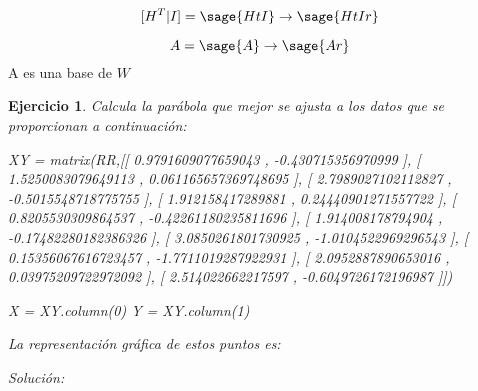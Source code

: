 \documentclass{amsart}
\newtheorem{ejer}{Ejercicio}
\begin{document}
$$
	[H^T|I] = \sage{HtI} \to \sage{HtIr}
$$

$$
	A = \sage{A} \to \sage{Ar}
$$
A es una base de $W$


\begin{ejer} 
Calcula la parábola que mejor se ajusta a los datos que se proporcionan a continuación:
\begin{sageblock}
XY = matrix(RR,[[ 0.9791609077659043 ,  -0.430715356970999 ],
                [ 1.5250083079649113 ,  0.061165657369748695 ],
                [ 2.7989027102112827 ,  -0.5015548718775755 ],
                [ 1.912158417289881 ,  0.24440901271557722 ],
                [ 0.8205530309864537 ,  -0.42261180235811696 ],
                [ 1.914008178794904 ,  -0.17482280182386326 ],
                [ 3.0850261801730925 ,  -1.0104522969296543 ],
                [ 0.15356067616723457 ,  -1.7711019287922931 ],
                [ 2.0952887890653016 ,  0.03975209722972092 ],
                [ 2.514022662217597 ,  -0.6049726172196987 ]])

X = XY.column(0)
Y = XY.column(1)
\end{sageblock}

La representación gráfica de estos puntos es:

\begin{sagesub}
\begin{center}
\end{center}
\end{sagesub}


\end{ejer} 

{\it Solución:}


\end{document}
